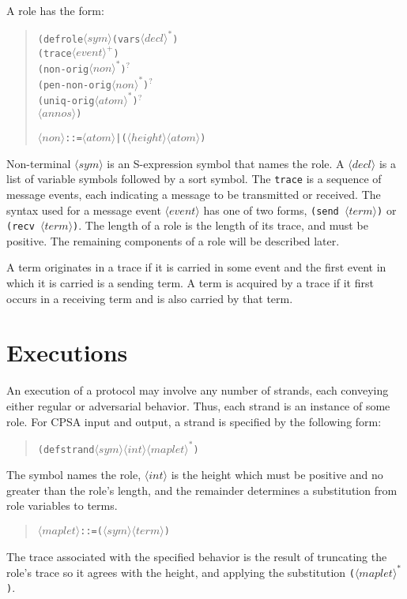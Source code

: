 \documentclass[12pt]{article}
\newcommand{\nterm}[1]{\ensuremath{\langle\mathit{#1}\rangle}}
\newcommand{\nterms}[1]{\ensuremath{\nterm{#1}^\ast}}
\newcommand{\ntermp}[1]{\ensuremath{\nterm{#1}^+}}
\newcommand{\ntermo}[1]{#1$^?$}
\begin{document}
A role has the form:
\begin{quote}
\begin{alltt}
(defrole \nterm{sym} (vars \nterms{decl})
\quad (trace \ntermp{event})
\quad \ntermo{(non-orig \nterms{non})}
\quad \ntermo{(pen-non-orig \nterms{non})}
\quad \ntermo{(uniq-orig \nterms{atom})}
\quad \nterm{annos})

\nterm{non} ::= \nterm{atom} | (\nterm{height} \nterm{atom})
\end{alltt}
\end{quote}
Non-terminal \nterm{sym} is an S-expression symbol that names the
role.  A \nterm{decl} is a list of variable symbols followed by a sort
symbol.  The \texttt{trace} is a sequence of message events, each
indicating a message to be transmitted or received.  The syntax used
for a message event \nterm{event} has
one of two forms, \texttt{(send \nterm{term})} or \texttt{(recv
  \nterm{term})}.  The length of a role is the length of its trace,
and must be positive.  The remaining components of a role will be
described later.

A term originates in a trace if it is carried in some event
and the first event in which it is carried is a sending term.
A term is acquired by a trace if it first occurs in a receiving term
and is also carried by that term.

\section{Executions}

An execution of a protocol may involve any number of strands, each
conveying either regular or adversarial behavior.  Thus, each strand
is an instance of some role.  For CPSA input and output, a strand is
specified by the following form:
\begin{quote}
\begin{alltt}
(defstrand \nterm{sym} \nterm{int} \nterms{maplet})
\end{alltt}
\end{quote}
The symbol names the role, \nterm{int} is the height which must be
positive and no greater than the role's length, and the remainder
determines a substitution from role variables to terms.
\begin{quote}
\begin{alltt}
\nterm{maplet} ::= (\nterm{sym} \nterm{term})
\end{alltt}
\end{quote}
The trace associated with the specified behavior is the result of
truncating the role's trace so it agrees with the height, and applying
the substitution \texttt{(\nterms{maplet})}.
\end{document}

